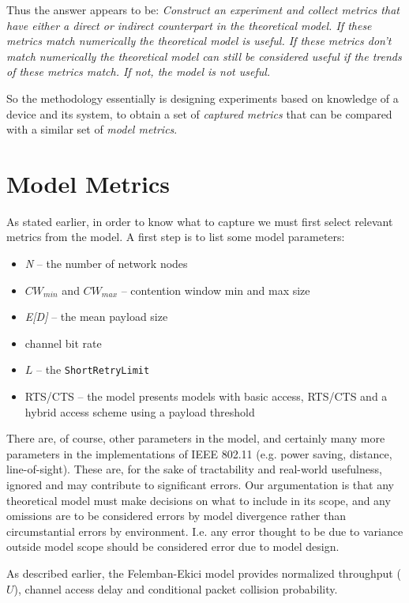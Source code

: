 Thus the answer appears to be: \emph{Construct an experiment and collect
metrics that have either a direct or indirect counterpart in the theoretical
model. If these metrics match numerically the theoretical model is useful. If
these metrics don't match numerically the theoretical model can still be
considered useful if the trends of these metrics match. If not, the model is
not useful.}

So the methodology essentially is designing experiments based on knowledge of
a device and its system, to obtain a set of \emph{captured metrics} that can
be compared with a similar set of \emph{model metrics}.

\section{Model Metrics}

As stated earlier, in order to know what to capture we must first select relevant
metrics from the model. A first step is to list some model parameters:

\begin{itemize}
	\item \emph{N} -- the number of network nodes
	\item $CW_{min}$ and $CW_{max}$ -- contention window min and max size
	\item \emph{E[D]} -- the mean payload size
	\item channel bit rate
	\item $L$ -- the \texttt{ShortRetryLimit}
	\item RTS/CTS -- the model presents models with basic access, RTS/CTS and a
	hybrid access scheme using a payload threshold
\end{itemize}

There are, of course, other parameters in the model, and certainly many more
parameters in the implementations of IEEE 802.11 (e.g. power saving, distance,
line-of-sight). These are, for the sake of tractability and real-world
usefulness, ignored and may contribute to significant errors. Our
argumentation is that any theoretical model must make decisions on what to
include in its scope, and any omissions are to be considered errors by model
divergence rather than circumstantial errors by environment. I.e. any error
thought to be due to variance outside model scope should be considered error
due to model design.

As described earlier, the Felemban-Ekici model provides normalized throughput
($U$), channel access delay and conditional packet collision probability.

